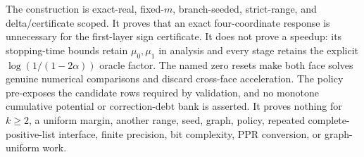 \begin{theorem}
The construction is exact-real, fixed-$m$, branch-seeded, strict-range, and
delta/certificate scoped.  It proves that an exact four-coordinate response
is unnecessary for the first-layer sign certificate.  It does not prove a
speedup: its stopping-time bounds retain $\mu_0,\mu_1$ in analysis and every
stage retains the explicit $\log(1/(1-2\alpha))$ oracle factor.  The named
zero resets make both face solves genuine numerical comparisons and discard
cross-face acceleration.  The policy pre-exposes the candidate rows required
by validation, and no monotone cumulative potential or correction-debt bank
is asserted.  It proves nothing for $k\geq2$, a uniform margin, another
range, seed, graph, policy, repeated complete-positive-list interface,
finite precision, bit complexity, PPR conversion, or graph-uniform work.
\end{theorem}

